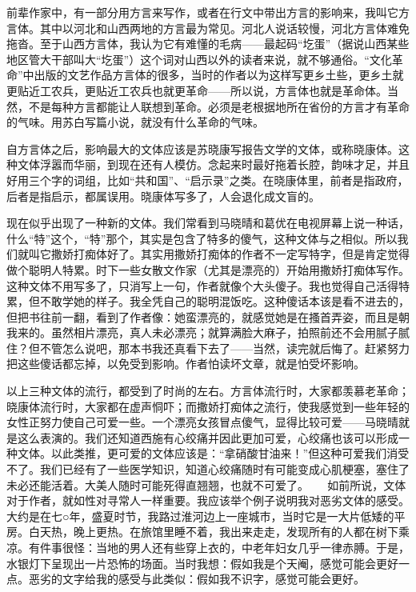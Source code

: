 前辈作家中，有一部分用方言来写作，或者在行文中带出方言的影响来，我叫它方言体。其中以河北和山西两地的方言最为常见。河北人说话较慢，河北方言体难免拖沓。至于山西方言体，我认为它有难懂的毛病——最起码“圪蛋”（据说山西某些地区管大干部叫大“圪蛋”）这个词对山西以外的读者来说，就不够通俗。“文化革命”中出版的文艺作品方言体的很多，当时的作者以为这样写更乡土些，更乡土就更贴近工农兵，更贴近工农兵也就更革命——所以说，方言体也就是革命体。当然，不是每种方言都能让人联想到革命。必须是老根据地所在省份的方言才有革命的气味。用苏白写篇小说，就没有什么革命的气味。　 

自方言体之后，影响最大的文体应该是苏晓康写报告文学的文体，或称晓康体。这种文体浮嚣而华丽，到现在还有人模仿。念起来时最好拖着长腔，韵味才足，并且好用三个字的词组，比如“共和国”、“启示录”之类。在晓康体里，前者是指政府，后者是指启示，都属误用。晓康体写多了，人会退化成文盲的。　 

现在似乎出现了一种新的文体。我们常看到马晓晴和葛优在电视屏幕上说一种话，什么“特”这个，“特”那个，其实是包含了特多的傻气，这种文体与之相似。所以我们就叫它撒娇打痴体好了。其实用撒娇打痴体的作者不一定写特字，但是肯定觉得做个聪明人特累。时下一些女散文作家（尤其是漂亮的）开始用撒娇打痴体写作。这种文体不用写多了，只消写上一句，作者就像个大头傻子。我也觉得自己活得特累，但不敢学她的样子。我全凭自己的聪明混饭吃。这种傻话本该是看不进去的，但把书往前一翻，看到了作者像：她蛮漂亮的，就感觉她是在搔首弄姿，而且是朝我来的。虽然相片漂亮，真人未必漂亮；就算满脸大麻子，拍照前还不会用腻子腻住？但不管怎么说吧，那本书我还真看下去了——当然，读完就后悔了。赶紧努力把这些傻话都忘掉，以免受到影响。作者怕读坏文章，就是怕受坏影响。　 

以上三种文体的流行，都受到了时尚的左右。方言体流行时，大家都羡慕老革命；晓康体流行时，大家都在虚声恫吓；而撒娇打痴体之流行，使我感觉到一些年轻的女性正努力使自己可爱一些。一个漂亮女孩冒点傻气，显得比较可爱——马晓晴就是这么表演的。我们还知道西施有心绞痛并因此更加可爱，心绞痛也该可以形成一种文体。以此类推，更可爱的文体应该是：“拿硝酸甘油来！”但这种可爱我们消受不了。我们已经有了一些医学知识，知道心绞痛随时有可能变成心肌梗塞，塞住了未必还能活着。大美人随时可能死得直翘翘，也就不可爱了。 　 如前所说，文体对于作者，就如性对寻常人一样重要。我应该举个例子说明我对恶劣文体的感受。大约是在七○年，盛夏时节，我路过淮河边上一座城市，当时它是一大片低矮的平房。白天热，晚上更热。在旅馆里睡不着，我出来走走，发现所有的人都在树下乘凉。有件事很怪：当地的男人还有些穿上衣的，中老年妇女几乎一律赤膊。于是，水银灯下呈现出一片恐怖的场面。当时我想：假如我是个天阉，感觉可能会更好一点。恶劣的文字给我的感受与此类似：假如我不识字，感觉可能会更好。　

